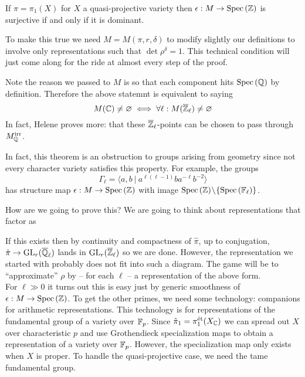 \documentclass[12pt]{article}
\begin{document}
\begin{theorem}
If $\pi = \pi_1(X)$ for $X$ a quasi-projective variety then $\epsilon : M \to \mathrm{Spec}\left( \mathbb{Z} \right)$ is surjective if and only if it is dominant.
\end{theorem}

\begin{rmk}
To make this true we need $M = M(\pi, r, \delta)$ to modify slightly our definitions to involve only representations such that $\det{\rho}^\delta = 1$. This technical condition will just come along for the ride at almost every step of the proof.
\end{rmk}

\begin{rmk}
Note the reason we passed to $M$ is so that each component hits $\mathrm{Spec}\left( \mathbb{Q} \right)$ by definition. Therefore the above statemnt is equivalent to saying 
\[ M(\mathbb{C}) \neq \varnothing \iff \forall \ell : M(\overline{\mathbb{Z}}_{\ell}) \neq \varnothing \]
In fact, Helene proves more: that these $\overline{\mathbb{Z}}_{\ell}$-points can be chosen to pass through $M^{\mathrm{irr}}_{\mathbb{Q}}$.
\end{rmk}

\begin{rmk}
In fact, this theorem is an obstruction to groups arising from geometry since not every character variety satisfies this property. For example, the groups
\[ \Gamma_{\ell} = \langle a,b\ \vert\ a^{\ell(\ell-1)}ba^{-\ell}b^{-2}\rangle \]
has structure map $\epsilon : M \to \mathrm{Spec}\left( \mathbb{Z} \right)$
with image $\mathrm{Spec}\left( \mathbb{Z} \right) \! \setminus \! \{ \mathrm{Spec}\left( \mathbb{F}_\ell \right) \}$.
\end{rmk}

How are we going to prove this? We are going to think about representations that factor as 
\begin{center}
\end{center}
If this exists then by continuity and compactness of $\hat{\pi}$, up to conjugation, $\hat{\pi} \to \mathrm{GL}_r(\overline{\mathbb{Q}}_\ell)$ lands in $\mathrm{GL}_r(\overline{\mathbb{Z}}_\ell)$ so we are done. However, the representation we started with probably does not fit into such a diagram. The game will be to ``approximate'' $\rho$ by -- for each $\ell$ -- a representation of the above form.
\bigskip\\
For $\ell \gg 0$ it turns out this is easy just by generic smoothness of $\epsilon : M \to \mathrm{Spec}\left( \mathbb{Z} \right)$. To get the other primes, we need some technology: companions for arithmetic representations. This technology is for representations of the fundamental group of a variety over $\mathbb{F}_p$. Since $\hat{\pi}_1 = \pi_1^{\text{\'{e}t}}(X_{\mathbb{C}})$ we can spread out $X$ over characteristic $p$ and use Grothendieck specialization maps to obtain a representation of a variety over $\mathbb{F}_p$. However, the specialization map only exists when $X$ is proper. To handle the quasi-projective case, we need the tame fundamental group.
\end{document}
